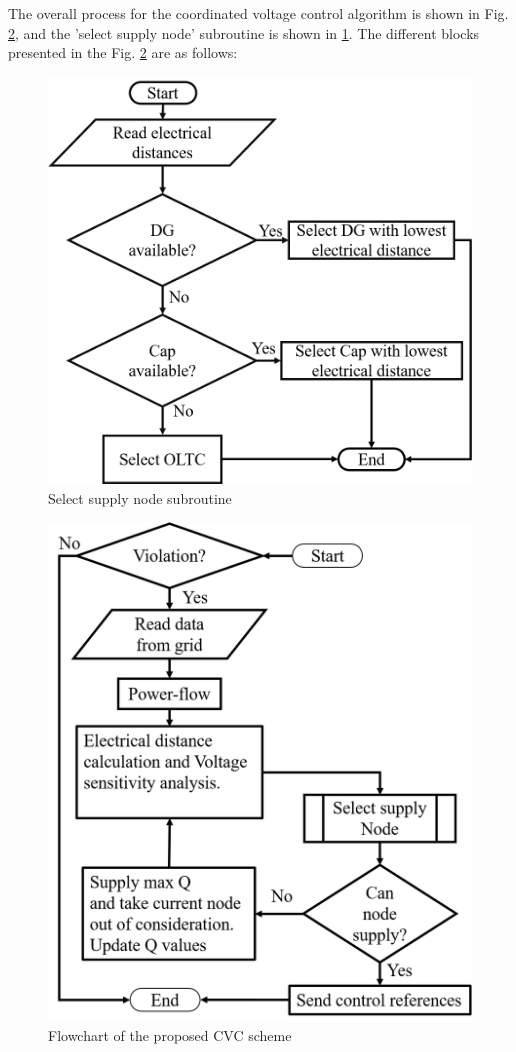 The overall process for the coordinated voltage control algorithm is shown in Fig. \ref{fig:Overview}, and the 'select supply node' subroutine is shown in \ref{fig:sub_rou}. The different blocks presented in the Fig. \ref{fig:Overview} are as follows:

\begin{figure}[!h]
\centering
\includegraphics[width=0.8\linewidth]{figs/Flow_chart_2_1.png}
\caption{Select supply node subroutine}
\label{fig:sub_rou}
\end{figure}



\begin{figure}[!h]
\centering
\includegraphics[width=0.8\linewidth]{figs/FLOW_CHART_3.png}
\caption{Flowchart of the proposed CVC scheme}
\label{fig:Overview}
\end{figure}

